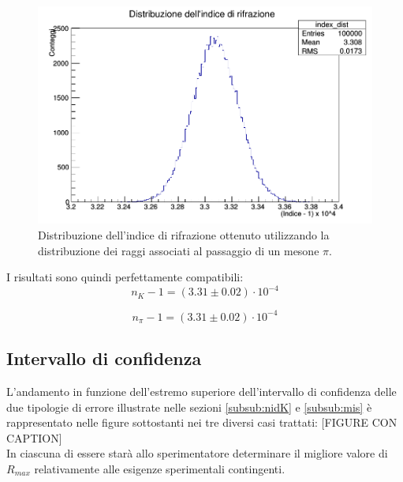 \documentclass[8pt]{extarticle}
\begin{document}
\begin{figure}
\begin{center}
\includegraphics[scale=0.4]{indicePI_definitivo}
\caption{Distribuzione dell'indice di rifrazione ottenuto utilizzando la distribuzione dei raggi associati al passaggio di un mesone $\pi$.}
\label{fig:indicePI}
\end{center}
\end{figure}

I risultati sono quindi perfettamente compatibili: \\
\begin{equation}
n_K -1 = (3.31 \pm 0.02) \cdot 10^{-4}
\nonumber
\end{equation}

\begin{equation}
n_{\pi} -1 = (3.31 \pm 0.02) \cdot 10^{-4}
\nonumber
\end{equation}

\subsection{Intervallo di confidenza}
L'andamento in funzione dell'estremo superiore dell'intervallo di confidenza delle due tipologie di errore illustrate nelle sezioni \ref{subsub:nidK} e \ref{subsub:mis} è rappresentato nelle figure sottostanti nei tre diversi casi trattati:
[FIGURE CON CAPTION]
\\
In ciascuna di essere starà allo sperimentatore determinare il migliore valore di $R_{max}$ relativamente alle esigenze sperimentali contingenti.
\end{document}

